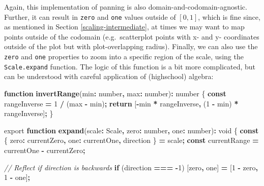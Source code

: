 \documentclass[
  openany]{book}
\newenvironment{Shaded}{\begin{snugshade}}{\end{snugshade}}
\newcommand{\CommentTok}[1]{\textcolor[rgb]{0.56,0.35,0.01}{\textit{#1}}}
\newcommand{\ControlFlowTok}[1]{\textcolor[rgb]{0.13,0.29,0.53}{\textbf{#1}}}
\newcommand{\DataTypeTok}[1]{\textcolor[rgb]{0.13,0.29,0.53}{#1}}
\newcommand{\DecValTok}[1]{\textcolor[rgb]{0.00,0.00,0.81}{#1}}
\newcommand{\FunctionTok}[1]{\textcolor[rgb]{0.13,0.29,0.53}{\textbf{#1}}}
\newcommand{\ImportTok}[1]{#1}
\newcommand{\KeywordTok}[1]{\textcolor[rgb]{0.13,0.29,0.53}{\textbf{#1}}}
\newcommand{\NormalTok}[1]{#1}
\newcommand{\OperatorTok}[1]{\textcolor[rgb]{0.81,0.36,0.00}{\textbf{#1}}}
\theoremstyle{definition}
\theoremstyle{definition}
\theoremstyle{definition}
\theoremstyle{definition}
\theoremstyle{remark}
\begin{document}
Again, this implementation of panning is also domain-and-codomain-agnostic. Further, it can result in \texttt{zero} and \texttt{one} values outside of \([0, 1]\), which is fine since, as mentioned in Section \ref{scaling-intermediate}, at times we may want to map points outside of the codomain (e.g.~scatterplot points with x- and y- coordinates outside of the plot but with plot-overlapping radius). Finally, we can also use the \texttt{zero} and \texttt{one} properties to zoom into a specific region of the scale, using the \texttt{Scale.expand} function. The logic of this function is a bit more complicated, but can be understood with careful application of (highschool) algebra:

\begin{Shaded}
\begin{Highlighting}[]
\KeywordTok{function} \FunctionTok{invertRange}\NormalTok{(min}\OperatorTok{:} \DataTypeTok{number}\OperatorTok{,}\NormalTok{ max}\OperatorTok{:} \DataTypeTok{number}\NormalTok{)}\OperatorTok{:} \DataTypeTok{number}\NormalTok{ \{}
  \KeywordTok{const}\NormalTok{ rangeInverse }\OperatorTok{=} \DecValTok{1} \OperatorTok{/}\NormalTok{ (max }\OperatorTok{{-}}\NormalTok{ min)}\OperatorTok{;}
    \ControlFlowTok{return}\NormalTok{ [}\OperatorTok{{-}}\NormalTok{min }\OperatorTok{*}\NormalTok{ rangeInverse}\OperatorTok{,}\NormalTok{ (}\DecValTok{1} \OperatorTok{{-}}\NormalTok{ min) }\OperatorTok{*}\NormalTok{ rangeInverse]}\OperatorTok{;}
\NormalTok{\}}

\ImportTok{export} \KeywordTok{function} \FunctionTok{expand}\NormalTok{(scale}\OperatorTok{:}\NormalTok{ Scale}\OperatorTok{,} 
\NormalTok{                       zero}\OperatorTok{:} \DataTypeTok{number}\OperatorTok{,}\NormalTok{ one}\OperatorTok{:} \DataTypeTok{number}\NormalTok{)}\OperatorTok{:} \DataTypeTok{void}\NormalTok{ \{}
  \KeywordTok{const}\NormalTok{ \{ zero}\OperatorTok{:}\NormalTok{ currentZero}\OperatorTok{,}\NormalTok{ one}\OperatorTok{:}\NormalTok{ currentOne}\OperatorTok{,}\NormalTok{ direction \} }\OperatorTok{=}\NormalTok{ scale}\OperatorTok{;}
  \KeywordTok{const}\NormalTok{ currentRange }\OperatorTok{=}\NormalTok{ currentOne }\OperatorTok{{-}}\NormalTok{ currentZero}\OperatorTok{;}

  \CommentTok{// Reflect if direction is backwards}
  \ControlFlowTok{if}\NormalTok{ (direction }\OperatorTok{===} \OperatorTok{{-}}\DecValTok{1}\NormalTok{) [zero}\OperatorTok{,}\NormalTok{ one] }\OperatorTok{=}\NormalTok{ [}\DecValTok{1} \OperatorTok{{-}}\NormalTok{ zero}\OperatorTok{,} \DecValTok{1} \OperatorTok{{-}}\NormalTok{ one]}\OperatorTok{;}


\end{Highlighting}
\end{Shaded}
\end{document}
